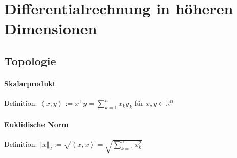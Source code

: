 \documentclass[11pt,a4paper]{book}
\newcommand {\Rn}	{\mathbb{R}^n}
\newcommand{\1}    	{\mathbbm{1}}
\begin{document}
\chapter{Differentialrechnung in höheren Dimensionen}

\section{Topologie}

\subsubsection*{Skalarprodukt}
Definition: \( \left< x,y \right> := x^\top y = \sum_{k=1}^n x_k y_k \) für \(x,y \in \Rn\)

\subsubsection*{Euklidische Norm}
Definition: \( \Vert x \Vert_2 := \sqrt{\left< x,x \right>} = \sqrt{\sum_{k=1}^n x_k^2} \)
\end{document}
